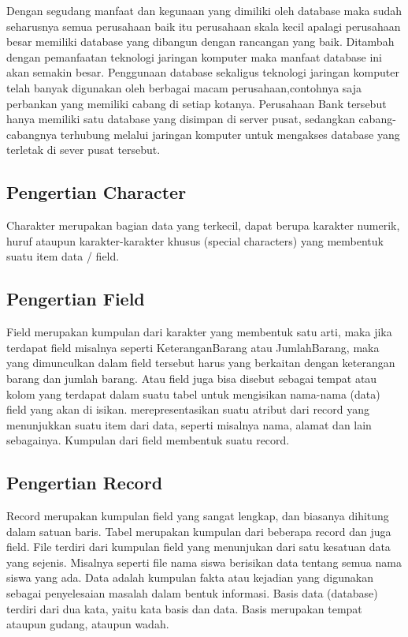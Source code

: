 	Dengan segudang manfaat dan kegunaan yang dimiliki oleh database maka sudah seharusnya semua perusahaan baik itu perusahaan skala kecil apalagi perusahaan besar memiliki database yang dibangun dengan rancangan yang baik. Ditambah dengan pemanfaatan teknologi jaringan komputer maka manfaat database ini akan semakin besar. Penggunaan database sekaligus teknologi jaringan komputer telah banyak digunakan oleh berbagai macam perusahaan,contohnya saja perbankan yang memiliki cabang di setiap kotanya. Perusahaan Bank tersebut hanya memiliki satu database yang disimpan di server pusat, sedangkan cabang-cabangnya terhubung melalui jaringan komputer untuk mengakses database yang terletak di sever pusat tersebut.


\subsection{Pengertian Character}
	Charakter merupakan bagian data yang terkecil, dapat berupa karakter numerik, huruf ataupun karakter-karakter khusus (special characters) yang membentuk suatu item data / field.

\subsection{Pengertian Field} 
	Field merupakan kumpulan dari karakter yang membentuk satu arti, maka jika terdapat field misalnya seperti KeteranganBarang atau JumlahBarang, maka yang dimunculkan dalam field tersebut harus yang berkaitan dengan keterangan barang dan jumlah barang. Atau field juga bisa disebut sebagai tempat atau kolom yang terdapat dalam suatu tabel untuk mengisikan nama-nama (data) field yang akan di isikan. merepresentasikan suatu atribut dari record yang menunjukkan suatu item dari data, seperti misalnya nama, alamat dan lain sebagainya. Kumpulan dari field membentuk suatu record.

\subsection{Pengertian Record}
	Record merupakan kumpulan field yang sangat lengkap, dan biasanya dihitung dalam satuan baris. Tabel merupakan kumpulan dari beberapa record dan juga field. File terdiri dari kumpulan field yang menunjukan dari satu kesatuan data yang sejenis. Misalnya seperti file nama siswa berisikan data tentang semua nama siswa yang ada. Data adalah kumpulan fakta atau kejadian yang digunakan sebagai penyelesaian masalah dalam bentuk informasi. Basis data (database) terdiri dari dua kata, yaitu kata basis dan data. Basis merupakan tempat ataupun gudang, ataupun wadah.

